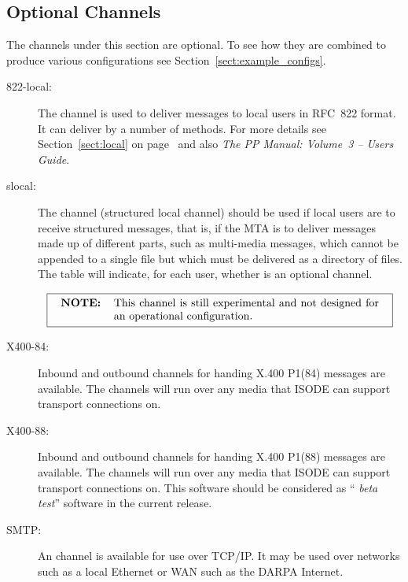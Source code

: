 \subsection {Optional Channels}

The channels under this section are optional.  To see how they are
combined to produce various configurations see
Section~\ref{sect:example_configs}.

\begin{description}
\item[822-local:]
The  channel is used to deliver messages to local users
in RFC~822 format.  It can deliver by a number of methods. For more
details see Section~\ref{sect:local} on page~\pageref{sect:local} and
also {\em The PP Manual: Volume~3 -- Users Guide}.


\item[slocal:]
The  channel (structured local channel) should be used if local
users are to receive structured messages, that is, if the MTA is to
deliver messages made up of different parts, such as multi-media
messages, which cannot be appended to a single file but which must be
delivered as a directory of files.  The  table will
indicate, for each user, whether  is an optional channel.

\[\fbox{
\begin{tabular}{l p{0.7\textwidth}}
\bf NOTE: & This channel is still experimental and not designed for an
operational configuration.
\end{tabular}
}\]

\item[X400-84:]

Inbound and outbound channels for handing X.400 P1(84) messages are
available. The channels will run over any media that ISODE can support
transport connections on.

\item[X400-88:]

Inbound and outbound channels for handing X.400 P1(88) messages are
available. The channels will run over any media that ISODE can support
transport connections on. This software should be considered as ``{\em
beta test}'' software in the current release.

\item[SMTP:]

An  channel is available for use over TCP/IP. It may be used
over networks such as a local Ethernet or WAN such as the DARPA
Internet.


\end{description}

